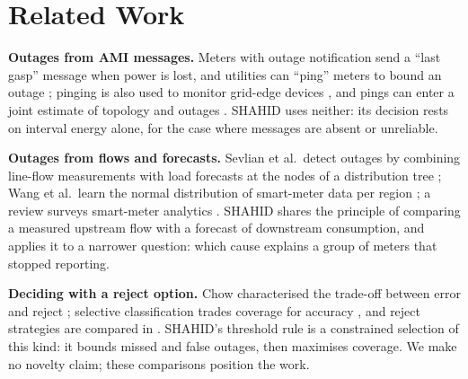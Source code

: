\section{Related Work}\label{sec:related}
\textbf{Outages from AMI messages.} Meters with outage notification send a ``last gasp'' message when
power is lost, and utilities can ``ping'' meters to bound an outage \cite{doe2016ami}; pinging is also
used to monitor grid-edge devices \cite{huang2021pinging}, and pings can enter a joint estimate of
topology and outages \cite{gandluru2019joint}. SHAHID uses neither: its decision rests on interval
energy alone, for the case where messages are absent or unreliable.

\textbf{Outages from flows and forecasts.} Sevlian et al.\ detect outages by combining line-flow
measurements with load forecasts at the nodes of a distribution tree \cite{sevlian2015outage}; Wang et
al.\ learn the normal distribution of smart-meter data per region \cite{wang2024outage}; a review
surveys smart-meter analytics \cite{wang2018review}. SHAHID shares the principle of comparing a
measured upstream flow with a forecast of downstream consumption, and applies it to a narrower
question: which cause explains a group of meters that stopped reporting.

\textbf{Deciding with a reject option.} Chow characterised the trade-off between error and reject
\cite{chow1970reject}; selective classification trades coverage for accuracy
\cite{elyaniv2010selective,geifman2017selective}, and reject strategies are compared in
\cite{franc2023reject}. SHAHID's threshold rule is a constrained selection of this kind: it bounds
missed and false outages, then maximises coverage. We make no novelty claim; these comparisons
position the work.
